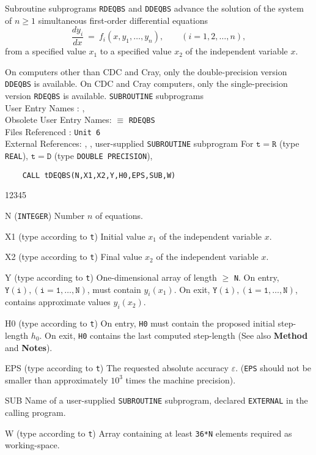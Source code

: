                          
                 
\Submitter{}                             
                   
Subroutine subprograms {\tt RDEQBS}  and {\tt DDEQBS} advance the
solution of the system of $n \ge 1$ simultaneous first-order
differential equations
$$ \frac{dy_i}{dx} \ = \
f_i(x,y_1,\ldots,y_n), \qquad (i = 1,2,\ldots,n),$$
from a specified value $x_1$ to a specified value $x_2$ of the
independent variable $x$.
\par
On computers other than CDC and Cray, only the double-precision version
{\tt DDEQBS} is available. On CDC and Cray computers,
only the single-precision version {\tt RDEQBS} is available.
\Structure
{\tt SUBROUTINE} subprograms \\
User Entry Names : , \\
Obsolete User Entry Names:  $\equiv$ {\tt RDEQBS} \\
Files  Referenced : {\tt Unit 6} \\
External References: , ,
user-supplied {\tt SUBROUTINE} subprogram
\Usage
For $\mathtt{t=R}$ (type {\tt REAL}), $\mathtt{t=D}$ (type
{\tt DOUBLE PRECISION}),
\begin{verbatim}
    CALL tDEQBS(N,X1,X2,Y,H0,EPS,SUB,W)
\end{verbatim}
\begin{DLtt}{12345}
\item[N] ({\tt INTEGER}) Number $n$ of equations.
\item[X1] (type according to {\tt t}) Initial value $x_1$ of the
independent variable $x$.
\item[X2] (type according to {\tt t})
Final value $x_2$ of the independent variable $x$.
\item[Y] (type according to {\tt t})
One-dimensional array of length $\ge $ {\tt N}.
On entry, $\mathtt{Y(i),(i=1,\ldots,N)}$, must contain $y_i(x_1)$.
On exit, $\mathtt{Y(i),(i=1,\ldots,N)}$, contains approximate values
 $y_i(x_2)$.
\item[H0] (type according to {\tt t}) On entry, {\tt H0} must contain
the proposed initial step-length $h_0$. On exit, {\tt H0} contains
the last computed step-length (See also {\bf Method} and {\bf Notes}).
\item[EPS] (type according to {\tt t}) The requested absolute
accuracy $\varepsilon$. ({\tt EPS} should not be smaller
than approximately $10^3$ times the machine precision).
\item[SUB] Name of a user-supplied {\tt SUBROUTINE} subprogram,
declared {\tt EXTERNAL} in the calling program.
\item[W] (type according to {\tt t}) Array containing at least
{\tt 36*N} elements required as working-space.
\end{DLtt}
